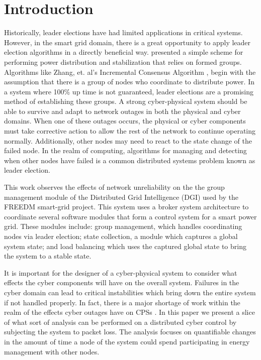 \section{Introduction}

Historically, leader elections have had limited applications in critical systems. However, in the smart grid domain, there is a great opportunity to apply leader election algorithms in a directly beneficial way. \cite{LOADBALANCING} presented a simple scheme for performing power distribution and stabilization that relies on formed groups. Algorithms like Zhang, et. al's Incremental Consensus Algorithm \cite{INCREMENTALCONSENSUS}, begin with the assumption that there is a group of nodes who coordinate to distribute power. In a system where 100\% up time is not guaranteed, leader elections are a promising method of establishing these groups.
A strong cyber-physical system should be able to survive and adapt to network outages in both the physical and cyber domains. When one of these outages occurs, the physical or cyber components must take corrective action to allow the rest of the network to continue operating normally. Additionally, other nodes may need to react to the state change of the failed node. In the realm of computing, algorithms for managing and detecting when other nodes have failed is a common distributed systems problem known as leader election.

This work observes the effects of network unreliability on the the group management module of the Distributed Grid Intelligence (DGI) used by the FREEDM smart-grid project. This system uses a broker system architecture to coordinate several software modules that form a control system for a smart power grid. These modules include: group management, which handles coordinating nodes via leader election; state collection, a module which
captures a global system state; and load balancing which uses the captured global state to bring the system to a stable state.

It is important for the designer of a cyber-physical system to consider what effects the cyber components will have on the overall system. Failures in the cyber domain can lead to critical instabilities which bring down the entire system if not handled properly.  In fact, there is a major shortage of work within the realm of the effects cyber outages have on CPSs \cite{CYBERRESEARCHCALL} \cite{SMARTGRIDBENEFITS}.
In this paper we present a slice of what sort of analysis can be performed on a distributed cyber control by subjecting the system to packet loss. The analysis focuses on quantifiable changes in the amount of time a node of the system could spend participating in energy management with other nodes.

